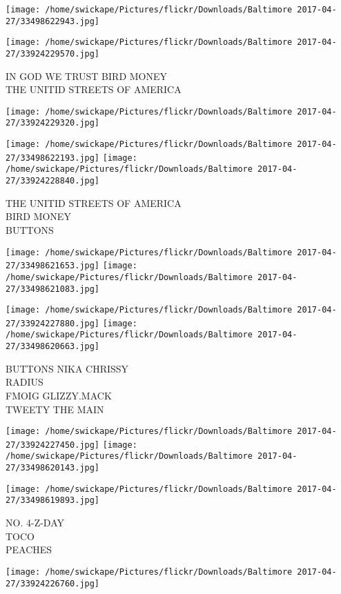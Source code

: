\documentclass[10pt,letterpaper]{article}
\begin{document}
\texttt{[image: /home/swickape/Pictures/flickr/Downloads/Baltimore 2017-04-27/33498622943.jpg]}

\vspace{0.25in}
\texttt{[image: /home/swickape/Pictures/flickr/Downloads/Baltimore 2017-04-27/33924229570.jpg]}

IN GOD WE TRUST BIRD MONEY\\
THE UNITID STREETS OF AMERICA
\pagebreak

\texttt{[image: /home/swickape/Pictures/flickr/Downloads/Baltimore 2017-04-27/33924229320.jpg]}

\vspace{0.25in}
\texttt{[image: /home/swickape/Pictures/flickr/Downloads/Baltimore 2017-04-27/33498622193.jpg]}
\texttt{[image: /home/swickape/Pictures/flickr/Downloads/Baltimore 2017-04-27/33924228840.jpg]}

THE UNITID STREETS OF AMERICA\\
BIRD MONEY\\
BUTTONS
\pagebreak

\texttt{[image: /home/swickape/Pictures/flickr/Downloads/Baltimore 2017-04-27/33498621653.jpg]}
\texttt{[image: /home/swickape/Pictures/flickr/Downloads/Baltimore 2017-04-27/33498621083.jpg]}

\texttt{[image: /home/swickape/Pictures/flickr/Downloads/Baltimore 2017-04-27/33924227880.jpg]}
\texttt{[image: /home/swickape/Pictures/flickr/Downloads/Baltimore 2017-04-27/33498620663.jpg]}

BUTTONS NIKA CHRISSY\\
RADIUS\\
FMOIG GLIZZY.MACK\\
TWEETY THE MAIN
\pagebreak

\texttt{[image: /home/swickape/Pictures/flickr/Downloads/Baltimore 2017-04-27/33924227450.jpg]}
\texttt{[image: /home/swickape/Pictures/flickr/Downloads/Baltimore 2017-04-27/33498620143.jpg]}

\texttt{[image: /home/swickape/Pictures/flickr/Downloads/Baltimore 2017-04-27/33498619893.jpg]}

NO. 4{-}Z{-}DAY\\
TOCO\\
PEACHES
\pagebreak

\texttt{[image: /home/swickape/Pictures/flickr/Downloads/Baltimore 2017-04-27/33924226760.jpg]}
\end{document}
